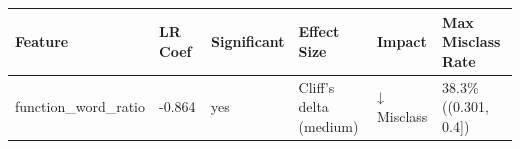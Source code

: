 \begin{tabular}{llllll}
\toprule
Feature & LR Coef & Significant & Effect Size & Impact & Max Misclass Rate \\
\midrule
function\_word\_ratio & -0.864 & yes & Cliff's delta (medium) & ↓ Misclass & 38.3\% ((0.301, 0.4]) \\
\bottomrule
\end{tabular}
